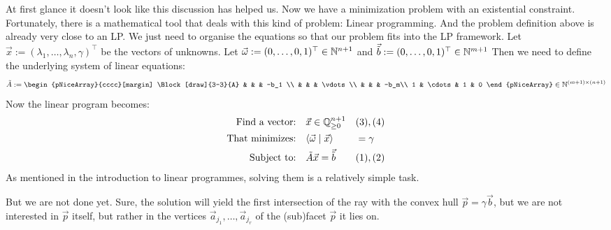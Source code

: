 At first glance it doesn't look like this discussion has helped us. Now we have a minimization problem with an existential constraint. Fortunately, there is a mathematical tool that deals with this kind of problem: Linear programming. And the problem definition above is already very close to an LP. We just need to organise the equations so that our problem fits into the LP framework. Let $\vec x := (\lambda_1, \dots, \lambda_n, \gamma)^\top$ be the vectors of unknowns. Let $\vec\omega := (0, \dots, 0, 1)^\top \in \mathbb{N}^{n+1}$ and $\vec{\tilde b} := (0, \dots, 0, 1)^\top \in \mathbb{N}^{m+1}$ Then we need to define the underlying system of linear equations:
$$\tilde A :=
\begin{pNiceArray}{cccc}[margin] 
\Block[draw]{3-3}{A} & & & -b_1 \\
& & & \vdots\\
& & & -b_m\\
1 & \cdots  & 1 & 0 
\end{pNiceArray} \in \N^{(m+1) \times (n+1)}$$
Now the linear program becomes:
\begin{align*}
    \text{Find a vector:} & \quad \vec x \in \mathbb{Q}^{n+1}_{\geq 0} &&(3), (4)\\
    \text{That minimizes:} & \quad \langle \vec \omega \mid \vec x \rangle &&=\gamma\\
    \text{Subject to:} & \quad \tilde A\vec x = \vec{\tilde b} &&(1), (2)
\end{align*}
As mentioned in the introduction to linear programmes, solving them is a relatively simple task.

But we are not done yet. Sure, the solution will yield the first intersection of the ray with the convex hull $\vec p = \gamma\vec b$, but we are not interested in $\vec p$ itself, but rather in the vertices $\vec a_{j_1}, \dots, \vec a_{j_r}$ of the (sub)facet $\vec p$ it lies on. 


